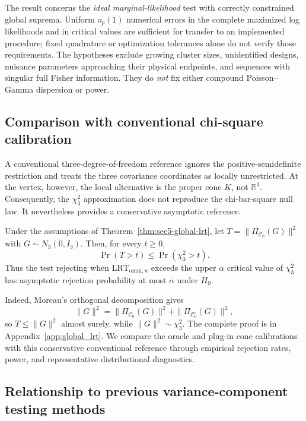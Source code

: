The result concerns the \emph{ideal marginal-likelihood} test with
correctly constrained global suprema. Uniform $o_p(1)$ numerical
errors in the complete maximized log likelihoods and in critical
values are sufficient for transfer to an implemented procedure;
fixed quadrature or optimization tolerances alone do not verify
those requirements. The hypotheses exclude growing cluster sizes,
unidentified designs, nuisance parameters approaching their
physical endpoints, and sequences with singular full Fisher
information. They do \emph{not} fix either compound
Poisson--Gamma dispersion or power.

\subsection{Comparison with conventional chi-square calibration}
\label{subsec:global_chisq_comparison}
A conventional three-degree-of-freedom reference ignores the
positive-semidefinite restriction and treats the three covariance
coordinates as locally unrestricted. At the vertex, however, the
local alternative is the proper cone $K$, not $\mathbb R^3$.
Consequently, the $\chi_3^2$ approximation does not reproduce the
chi-bar-square null law. It nevertheless provides a conservative
asymptotic reference.

\begin{proposition}\label{prop:sec5-chisq-conservative}
Under the assumptions of Theorem~\ref{thm:sec5-global-lrt},
let $T=\|\Pi_{\mathcal C_0}(G)\|^2$ with
$G\sim N_3(0,I_3)$. Then, for every $t\geq0$,
\begin{equation}\label{eq:sec5-chisq-order}
 \Pr(T>t)\leq\Pr(\chi_3^2>t).
\end{equation}
Thus the test rejecting when $\mathrm{LRT}_{\mathrm{omni},n}$ exceeds the
upper $\alpha$ critical value of $\chi_3^2$ has asymptotic
rejection probability at most $\alpha$ under $H_0$.
\end{proposition}

Indeed, Moreau's orthogonal decomposition gives
\[
 \|G\|^2=\|\Pi_{\mathcal C_0}(G)\|^2
 +\|\Pi_{\mathcal C_0^\circ}(G)\|^2,
\]
so $T\leq\|G\|^2$ almost surely, while
$\|G\|^2\sim\chi_3^2$. The complete proof is in
Appendix~\ref{app:global_lrt}.
We compare the oracle and plug-in cone calibrations with this
conservative conventional reference through empirical rejection
rates, power, and representative distributional diagnostics.

\subsection{Relationship to previous variance-component
testing methods}
\label{subsec:global_prior_methods}


